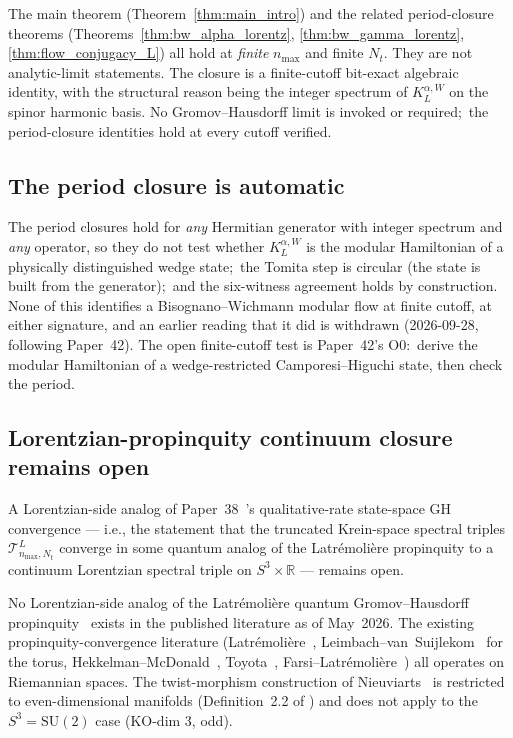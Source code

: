 \documentclass[11pt,a4paper]{article}
\theoremstyle{plain}
\theoremstyle{definition}
\newcommand{\nmax}{n_{\max}}
\newcommand{\Nt}{N_t}
\newcommand{\sthree}{S^{3}}
\newcommand{\Tcal}{\mathcal{T}}
\newcommand{\R}{\mathbb{R}}
\newcommand{\SU}{\mathrm{SU}}
\newcommand{\KL}{K_{L}}
\begin{document}
The main theorem (Theorem~\ref{thm:main_intro}) and the related
period-closure theorems
(Theorems~\ref{thm:bw_alpha_lorentz}, \ref{thm:bw_gamma_lorentz},
\ref{thm:flow_conjugacy_L}) all hold at \emph{finite} $\nmax$ and
finite $\Nt$. They are not analytic-limit statements. The closure is a
finite-cutoff bit-exact algebraic identity, with the structural reason
being the integer spectrum of $\KL^{\alpha, W}$ on the spinor harmonic
basis. No Gromov--Hausdorff limit is invoked or required;\ the
period-closure identities hold at every cutoff verified.

\subsection{The period closure is automatic}\label{sec:scope_automatic}

The period closures hold for \emph{any} Hermitian generator with
integer spectrum and \emph{any} operator, so they do not test whether
$\KL^{\alpha, W}$ is the modular Hamiltonian of a physically
distinguished wedge state;\ the Tomita step is circular (the state is
built from the generator);\ and the six-witness agreement holds by
construction.  None of this identifies a Bisognano--Wichmann modular
flow at finite cutoff, at either signature, and an earlier reading
that it did is withdrawn (2026-09-28, following Paper~42).  The open
finite-cutoff test is Paper~42's O0:\ derive the modular Hamiltonian
of a wedge-restricted Camporesi--Higuchi state, then check the period.

\subsection{Lorentzian-propinquity continuum closure remains open}
\label{sec:scope_lorentzian_propinquity}

A Lorentzian-side analog of Paper~38~\cite{paper38}'s qualitative-rate
state-space GH convergence — i.e., the statement that the truncated
Krein-space spectral triples $\Tcal_{\nmax, \Nt}^L$ converge in some
quantum analog of the Latr\'emoli\`ere propinquity to a continuum
Lorentzian spectral triple on $\sthree \times \R$ — remains open.

No Lorentzian-side analog of the Latr\'emoli\`ere quantum
Gromov--Hausdorff propinquity~\cite{latremoliere2018,
latremoliere_metric_st_2017} exists in the published
literature as of May~2026. The existing propinquity-convergence
literature (Latr\'emoli\`ere~\cite{latremoliere2018,
latremoliere_metric_st_2017}, Leimbach--van~Suijlekom~\cite{leimbach_vs2024}
for the torus, Hekkelman--McDonald~\cite{hekkelman_mcdonald2024b}, Toyota~\cite{toyota2023},
Farsi--Latr\'emoli\`ere~\cite{farsi_latremoliere2024,
farsi_latremoliere2025}) all operates on Riemannian spaces. The
twist-morphism construction of
Nieuviarts~\cite{nieuviarts2025a, nieuviarts2024,
nieuviarts2025b_proceedings} is restricted to even-dimensional
manifolds (Definition~2.2 of \cite{nieuviarts2025a}) and does not apply
to the $\sthree = \SU(2)$ case (KO-dim 3, odd).
\end{document}
